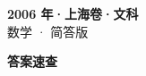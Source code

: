 \documentclass[zihao=-4, a4paper]{ctexart}
\begin{document}
\begin{center}
  {\Large\bfseries 2006 年·上海卷·文科}\\[4pt]
  {\large 数学 · 简答版}
\end{center}
\medskip
{}

\clearpage
{}
\begin{center}{\Large\bfseries 答案速查}\end{center}
\medskip

\end{document}
